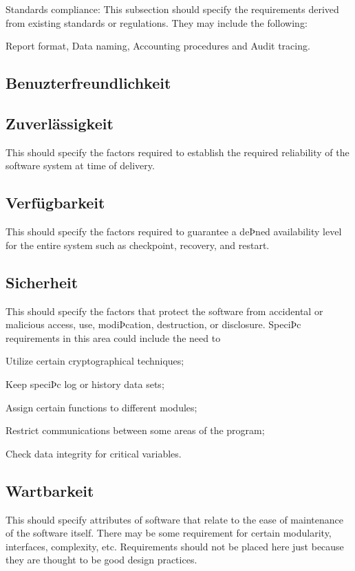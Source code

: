 		Standards compliance: This subsection should specify the requirements derived from existing standards or regulations. They may include the following: 
		
		Report format, Data naming, Accounting procedures and Audit tracing.
	
	\subsection{Benuzterfreundlichkeit}

	\subsection{Zuverlässigkeit}
		This should specify the factors required to establish the required reliability of the software system at time of delivery.
	
	\subsection{Verfügbarkeit}
		This should specify the factors required to guarantee a deÞned availability level for the entire system such as checkpoint, recovery, and restart. 
	
	\subsection{Sicherheit}
		This should specify the factors that protect the software from accidental or malicious access, use, modiÞcation, destruction, or disclosure. SpeciÞc requirements in this area could include the need to
		
		Utilize certain cryptographical techniques; 
		
		Keep speciÞc log or history data sets;
		
		Assign certain functions to different modules;
		
		Restrict communications between some areas of the program;
		
		Check data integrity for critical variables.
	
	\subsection{Wartbarkeit}
		This should specify attributes of software that relate to the ease of maintenance of the software itself. There may be some requirement for certain modularity, interfaces, complexity, etc. Requirements should not be placed here just because they are thought to be good design practices.
	
